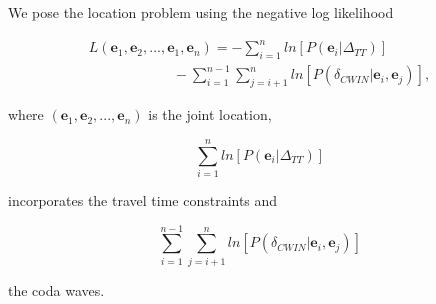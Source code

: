 \documentclass[12pt,double]{article}
\begin{document}
We pose the location problem using the negative log likelihood
\begin{linenomath*} \begin{equation}
\label{eq-Lstar-tt-cwi}
\begin{array}{l}
 L(\mathbf{e}_1, \mathbf{e}_2, ...,
\mathbf{e}_1, \mathbf{e}_n) = - \sum_{i=1}^n
ln\left[P(\mathbf{e}_i|\Delta_{TT})\right] \\
\hspace{6em}  - \sum_{i=1}^{n-1}
\sum_{j=i+1}^n
ln\left[P(\delta_{CWIN}|\mathbf{e}_i,\mathbf{e}_j)\right],
\end{array}
\end{equation} \end{linenomath*}
where $(\mathbf{e}_1, \mathbf{e}_2, ..., \mathbf{e}_n)$ is the joint
location,
\begin{linenomath*} \begin{equation}
\label{eq-ttcomponent} \sum_{i=1}^n
ln\left[P(\mathbf{e}_i|\Delta_{TT})\right]
\end{equation} \end{linenomath*}
incorporates the travel time constraints and
\begin{linenomath*} \begin{equation}
\label{eq-codacomponent} \sum_{i=1}^{n-1} \sum_{j=i+1}^n
ln\left[P(\delta_{CWIN}|\mathbf{e}_i,\mathbf{e}_j)\right]
\end{equation} \end{linenomath*}
 the coda waves.
\end{document}
